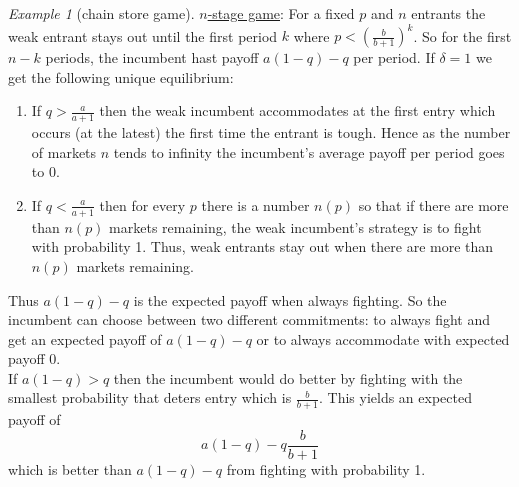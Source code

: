 \documentclass[a4paper, 12pt]{article}
\theoremstyle{plain}
\theoremstyle{definition}
\theoremstyle{lemma}
\theoremstyle{remark}
\theoremstyle{corollary}
\theoremstyle{example}
\newtheorem{example}[theorem]{Example}
\begin{document}
\begin{example}[chain store game]
		\underline{$n$-stage game}: For a fixed $p$ and $n$ entrants the weak entrant stays out until the first period $k$ where $p<\left(\frac{b}{b+1}\right)^k$. So for the first $n-k$ periods, the incumbent hast payoff $a(1-q)-q$ per period. If $\delta=1$ we get the following unique equilibrium:
		\begin{enumerate}
			\item If $q>\frac{a}{a+1}$ then the weak incumbent accommodates at the first entry which occurs (at the latest) the first time the entrant is tough. Hence as the number of markets $n$ tends to infinity the incumbent's average payoff per period goes to 0.
			\item If $q<\frac{a}{a+1}$ then for every $p$ there is a number $n(p)$ so that if there are more than $n(p)$ markets remaining, the weak incumbent's strategy is to fight with probability 1. Thus, weak entrants stay out when there are more than $n(p)$ markets remaining.
		\end{enumerate}
		Thus $a(1-q)-q$ is the expected payoff when always fighting. So the incumbent can choose between two different commitments: to always fight and get an expected payoff of $a(1-q)-q$ or to always accommodate with expected payoff 0.\\
		If $a(1-q)>q$ then the incumbent would do better by fighting with the smallest probability that deters entry which is $\frac{b}{b+1}$. This yields an expected payoff of \[a(1-q)-q\frac{b}{b+1}\] which is better than $a(1-q)-q$ from fighting with probability 1.
	\end{example}
\end{document}
